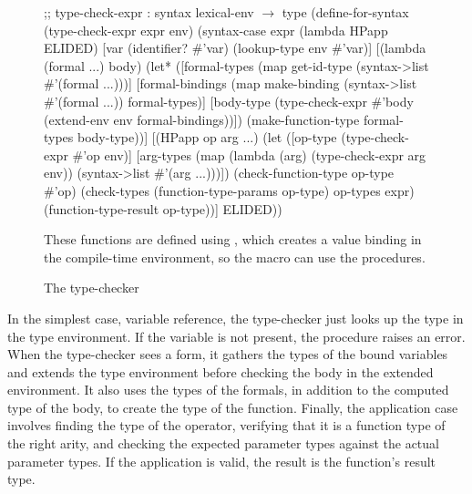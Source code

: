 \begin{schemeregion}
\begin{figure}[h!]
\begin{schemedisplay}
;; type-check-expr : syntax lexical-env $\rightarrow$ type
(define-for-syntax (type-check-expr expr env)
  (syntax-case expr (lambda HPapp ELIDED)
    [var
     (identifier? #'var)
     (lookup-type env #'var)]
    [(lambda (formal ...) body)
     (let* ([formal-types
             (map get-id-type (syntax->list #'(formal ...)))]
            [formal-bindings
             (map make-binding
                  (syntax->list #'(formal ...))
                  formal-types)]
            [body-type
             (type-check-expr #'body
                              (extend-env env formal-bindings))])
       (make-function-type formal-types body-type))]
    [(HPapp op arg ...)
     (let ([op-type (type-check-expr #'op env)]
           [arg-types  
            (map (lambda (arg) (type-check-expr arg env))
                 (syntax->list #'(arg ...)))])
       (check-function-type op-type #'op)
       (check-types (function-type-params op-type)
                    op-types
                    expr)
       (function-type-result op-type))]
    ELIDED))
\end{schemedisplay}

{\small
 These functions are defined using ,
  which creates a value binding in the compile-time environment, so
  the  macro can use the procedures.}

\caption{The type-checker}
\label{fig:type-checker}
\end{figure}
%
In the simplest case, variable reference, the type-checker
just looks up the type in the type environment. If the variable is not
present, the  procedure raises an error.
%
When the type-checker sees a  form, it gathers the
types of the bound variables and extends the type environment before
checking the body in the extended environment. It also uses the types
of the formals, in addition to the computed type of the body, to
create the type of the function.
%
Finally, the application case involves finding the type of the
operator, verifying that it is a function type of the right arity, and
checking the expected parameter types against the actual parameter
types. If the application is valid, the result is the function's
result type.
\end{schemeregion}
